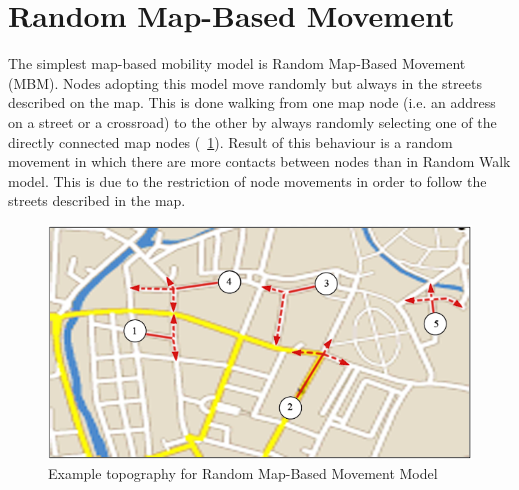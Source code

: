 \section{Random Map-Based Movement}
The simplest map-based mobility model is Random Map-Based Movement (MBM). Nodes adopting this model move randomly but always in the streets described on the map. This is done walking from one map node (i.e. an address on a street or a crossroad) to the other by always randomly selecting one of the directly connected map nodes (\figurename~\ref{fig:random_map}). Result of this behaviour is a random movement in which there are more contacts between nodes than in Random Walk model. This is due to the restriction of node movements in order to follow the streets described in the map.
\begin{figure}[htpb]
  \begin{center}
    \includegraphics[scale=0.6]{4-movimento/img/random_map.png}
    \caption{Example topography for Random Map-Based Movement Model}    
    \label{fig:random_map}
  \end{center}
\end{figure}

